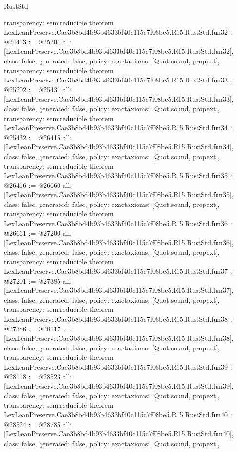 \begin{lexlean}{RustStd}
\begin{coremodule}
{  transparency: semireducible
}
theorem LexLeanPreserve.Cae3b8bd4b93b4633bf40c115c7f08be5.R15.RustStd.fun32 : @24413 := @25201 {
  all: [LexLeanPreserve.Cae3b8bd4b93b4633bf40c115c7f08be5.R15.RustStd.fun32],
  class: false,
  generated: false,
  policy: exact{axioms: [Quot.sound, propext]},
  transparency: semireducible
}
theorem LexLeanPreserve.Cae3b8bd4b93b4633bf40c115c7f08be5.R15.RustStd.fun33 : @25202 := @25431 {
  all: [LexLeanPreserve.Cae3b8bd4b93b4633bf40c115c7f08be5.R15.RustStd.fun33],
  class: false,
  generated: false,
  policy: exact{axioms: [Quot.sound, propext]},
  transparency: semireducible
}
theorem LexLeanPreserve.Cae3b8bd4b93b4633bf40c115c7f08be5.R15.RustStd.fun34 : @25432 := @26415 {
  all: [LexLeanPreserve.Cae3b8bd4b93b4633bf40c115c7f08be5.R15.RustStd.fun34],
  class: false,
  generated: false,
  policy: exact{axioms: [Quot.sound, propext]},
  transparency: semireducible
}
theorem LexLeanPreserve.Cae3b8bd4b93b4633bf40c115c7f08be5.R15.RustStd.fun35 : @26416 := @26660 {
  all: [LexLeanPreserve.Cae3b8bd4b93b4633bf40c115c7f08be5.R15.RustStd.fun35],
  class: false,
  generated: false,
  policy: exact{axioms: [Quot.sound, propext]},
  transparency: semireducible
}
theorem LexLeanPreserve.Cae3b8bd4b93b4633bf40c115c7f08be5.R15.RustStd.fun36 : @26661 := @27200 {
  all: [LexLeanPreserve.Cae3b8bd4b93b4633bf40c115c7f08be5.R15.RustStd.fun36],
  class: false,
  generated: false,
  policy: exact{axioms: [Quot.sound, propext]},
  transparency: semireducible
}
theorem LexLeanPreserve.Cae3b8bd4b93b4633bf40c115c7f08be5.R15.RustStd.fun37 : @27201 := @27385 {
  all: [LexLeanPreserve.Cae3b8bd4b93b4633bf40c115c7f08be5.R15.RustStd.fun37],
  class: false,
  generated: false,
  policy: exact{axioms: [Quot.sound, propext]},
  transparency: semireducible
}
theorem LexLeanPreserve.Cae3b8bd4b93b4633bf40c115c7f08be5.R15.RustStd.fun38 : @27386 := @28117 {
  all: [LexLeanPreserve.Cae3b8bd4b93b4633bf40c115c7f08be5.R15.RustStd.fun38],
  class: false,
  generated: false,
  policy: exact{axioms: [Quot.sound, propext]},
  transparency: semireducible
}
theorem LexLeanPreserve.Cae3b8bd4b93b4633bf40c115c7f08be5.R15.RustStd.fun39 : @28118 := @28523 {
  all: [LexLeanPreserve.Cae3b8bd4b93b4633bf40c115c7f08be5.R15.RustStd.fun39],
  class: false,
  generated: false,
  policy: exact{axioms: [Quot.sound, propext]},
  transparency: semireducible
}
theorem LexLeanPreserve.Cae3b8bd4b93b4633bf40c115c7f08be5.R15.RustStd.fun40 : @28524 := @28785 {
  all: [LexLeanPreserve.Cae3b8bd4b93b4633bf40c115c7f08be5.R15.RustStd.fun40],
  class: false,
  generated: false,
  policy: exact{axioms: [Quot.sound, propext]},
}
\end{coremodule}
\end{lexlean}
